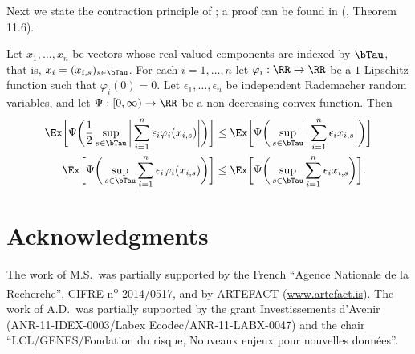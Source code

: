 Next we state the contraction principle of \citep{LedouxTal:91}; a proof can be found in
(\cite{boucheron2013concentration}, Theorem 11.6).
\begin{theorem}
Let $x_1,\dots,x_n$ be vectors whose real-valued components are indexed by $\bTau$,
that is, $x_i=(x_{i,s})_{s\in\bTau}$. For each $i=1,\dots,n$ let $\varphi_i:\RR\rightarrow\RR$
be a $1$-Lipschitz function such that $\varphi_i(0)=0$. Let $\epsilon_1,\dots,\epsilon_n$ be
independent Rademacher random variables, and let $\Psi:[0,\infty) \rightarrow \RR$ be a
non-decreasing convex function. Then
\begin{align}
  \Ex \bigg[\Psi\bigg(\frac{1}{2}\sup_{s\in\bTau}\bigg|\sum_{i=1}^n\epsilon_i\varphi_i(x_{i,s})\bigg| \bigg) \bigg]
  &\leq
  \Ex \bigg[\Psi\bigg(\sup_{s\in\bTau}\bigg|\sum_{i=1}^n\epsilon_i x_{i,s}\bigg| \bigg) \bigg]\\
  \Ex \bigg[\Psi\bigg(\sup_{s\in\bTau}\sum_{i=1}^n\epsilon_i\varphi_i(x_{i,s})\bigg) \bigg]
  &\leq  \Ex \bigg[\Psi\bigg(\sup_{s\in\bTau}\sum_{i=1}^n\epsilon_i x_{i,s} \bigg) \bigg] .
\end{align}
\end{theorem}

\section*{Acknowledgments}
The work of M.S.\ was partially supported by the French ``Agence Nationale de la Recherche'',
CIFRE n\textsuperscript{o} 2014/0517, and by {%
ARTEFACT} (\url{www.artefact.is}).
The work of A.D.\ was partially supported by the grant Investissements d'Avenir
(ANR-11-IDEX-0003/Labex Ecodec/ANR-11-LABX-0047) and the chair ``LCL/GENES/Fon\-da\-tion du
risque, Nouveaux enjeux pour nouvelles donn\'ees''.



